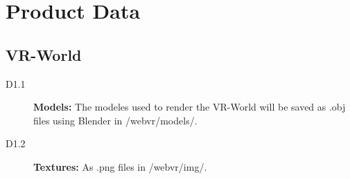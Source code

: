 \section{Product Data}

\subsection{VR-World}

\begin{description}
  \item[D1.1] \textbf{Models:} The modeles used to render the VR-World will be saved as .obj files using Blender in /webvr/models/.
  \item[D1.2] \textbf{Textures:} As .png files in /webvr/img/.
\end{description}


